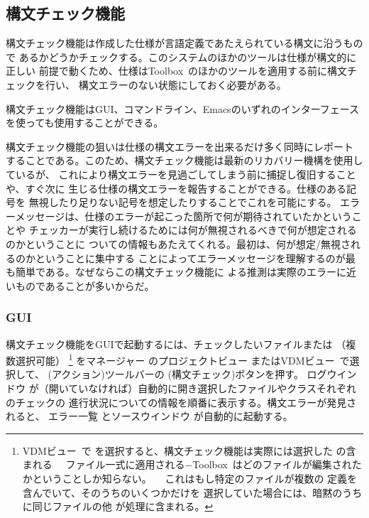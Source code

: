 \documentclass[\pformat,12pt]{jarticle}
\newcommand{\Toolbox}{Toolbox}
\newcommand{\vdmModView}{\guicmd{VDMビュー}}
\newcommand{\guicmd}[1]{{\gt #1}}
\begin{document}
\newpage
\subsection{構文チェック機能}\label{sec:parser}


構文チェック機能は作成した仕様が言語定義であたえられている構文に沿うもので
あるかどうかチェックする。このシステムのほかのツールは仕様が構文的に正しい
前提で動くため、仕様は\Toolbox\ のほかのツールを適用する前に構文チェックを行い、
構文エラーのない状態にしておく必要がある。

構文チェック機能はGUI、コマンドライン、Emacsのいずれのインターフェースを使っても使用することができる。

構文チェック機能の狙いは仕様の構文エラーを出来るだけ多く同時にレポート
することである。このため、構文チェック機能は最新のリカバリー機構を使用しているが、
これにより構文エラーを見過ごしてしまう前に捕捉し復旧することや、すぐ次に
生じる仕様の構文エラーを報告することができる。仕様のある記号を
無視したり足りない記号を想定したりすることでこれを可能にする。
エラーメッセージは、仕様のエラーが起こった箇所で何が期待されていたかということや
チェッカーが実行し続けるためには何が無視されるべきで何が想定されるのかということに
ついての情報もあたえてくれる。最初は、何が想定/無視されるのかということに集中する
ことによってエラーメッセージを理解するのが最も簡単である。なぜならこの構文チェック機能に
よる推測は実際のエラーに近いものであることが多いからだ。

\subsubsection{GUI}


構文チェック機能をGUIで起動するには、チェックしたいファイルまたは
 （複数選択可能）
\footnote{
  \vdmModView\ で
   を選択すると、構文チェック機能は実際には選択した
   の含まれる
　ファイル一式に適用される−\Toolbox\ はどのファイルが編集されたかということしか知らない。
　これはもし特定のファイルが複数の
   定義を含んでいて、そのうちのいくつかだけを
  選択していた場合には、暗黙のうちに同じファイルの他
   が処理に含まれる。
}
を\guicmd{マネージャー} の\guicmd{プロジェクトビュー} または\vdmModView\ で選択して、
(\guicmd{アクション})ツールバーの   
(\guicmd{構文チェック})ボタンを押す。
\guicmd{ログウインドウ} が（開いていなければ）自動的に開き選択したファイルやクラスそれぞれのチェックの
進行状況についての情報を順番に表示する。構文エラーが発見されると、
\guicmd{エラー一覧} と\guicmd{ソースウインドウ} が自動的に起動する。
\end{document}
